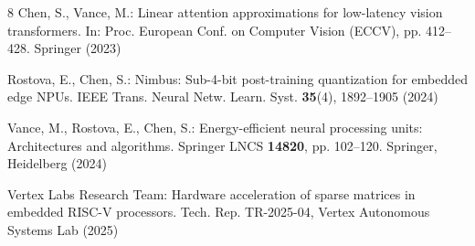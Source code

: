 \documentclass[runningheads]{llncs}
\begin{document}
\begin{thebibliography}{8}
Chen, S., Vance, M.: Linear attention approximations for low-latency vision transformers. In: Proc. European Conf. on Computer Vision (ECCV), pp. 412--428. Springer (2023)

Rostova, E., Chen, S.: Nimbus: Sub-4-bit post-training quantization for embedded edge NPUs. IEEE Trans. Neural Netw. Learn. Syst. \textbf{35}(4), 1892--1905 (2024)

Vance, M., Rostova, E., Chen, S.: Energy-efficient neural processing units: Architectures and algorithms. Springer LNCS \textbf{14820}, pp. 102--120. Springer, Heidelberg (2024)

Vertex Labs Research Team: Hardware acceleration of sparse matrices in embedded RISC-V processors. Tech. Rep. TR-2025-04, Vertex Autonomous Systems Lab (2025)

\end{thebibliography}
\end{document}

